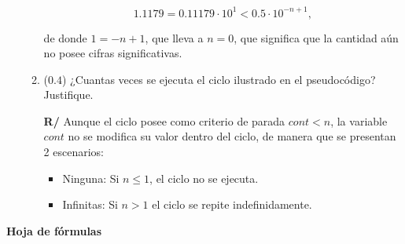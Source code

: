 \documentclass[12pt]{article}
\begin{document}
\begin{enumerate}[leftmargin=*,widest=9]
\begin{enumerate}[label=\alph*]
\[ 1.1179 = 0.11179 \cdot 10^1 < 0.5 \cdot 10^{-n+1},\]

de donde \(1 = -n + 1\), que lleva a \(n=0\), que significa que la cantidad aún no posee cifras significativas.

\item (\(0.4\)) ¿Cuantas veces se ejecuta el ciclo ilustrado en el pseudocódigo? Justifique.

\textbf{R/} Aunque el ciclo posee como criterio de parada \(cont<n\), la variable \(cont\) no se modifica su valor dentro del ciclo, de manera que se presentan 2 escenarios:

\begin{itemize}
\item Ninguna: Si \(n \leq 1\), el ciclo no se ejecuta.
\item Infinitas: Si \(n > 1\) el ciclo se repite indefinidamente. 
\end{itemize}

\end{enumerate}

\end{enumerate}
\begin{center}
\textbf{Hoja de fórmulas}
\vspace{-.5cm}
\end{center}
\end{document}

